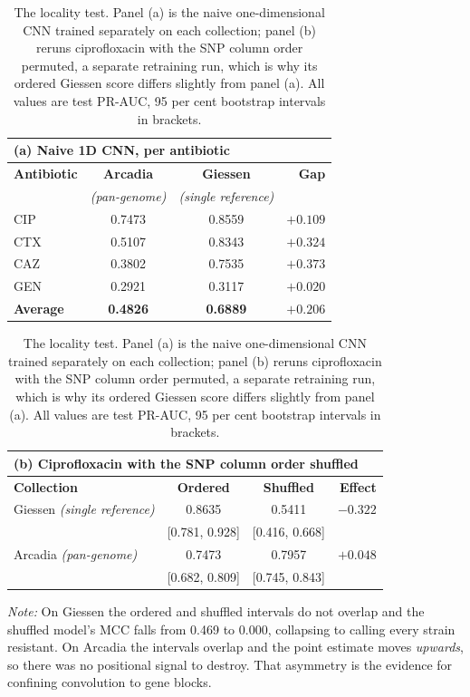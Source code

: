 \begin{table}[htb]
\centering
\caption{The locality test. Panel (a) is the naive one-dimensional CNN trained
separately on each collection; panel (b) reruns ciprofloxacin with the SNP column
order permuted, a separate retraining run, which is why its ordered Giessen score
differs slightly from panel (a). All values are test PR-AUC, 95 per cent bootstrap
intervals in brackets.}
\label{tab:locality}
\small
\begin{tabular}{|l|c|c|r|}
\hline
\multicolumn{4}{|l|}{\textbf{(a) Naive 1D CNN, per antibiotic}} \\ \hline
\textbf{Antibiotic} & \textbf{Arcadia} & \textbf{Giessen} & \textbf{Gap} \\
                    & \textit{(pan-genome)} & \textit{(single reference)} & \\ \hline
CIP & 0.7473 & 0.8559 & $+0.109$ \\ \hline
CTX & 0.5107 & 0.8343 & $+0.324$ \\ \hline
CAZ & 0.3802 & 0.7535 & $+0.373$ \\ \hline
GEN & 0.2921 & 0.3117 & $+0.020$ \\ \hline
\textbf{Average} & \textbf{0.4826} & \textbf{0.6889} & $\mathbf{+0.206}$ \\ \hline
\end{tabular}

\vspace{1em}

\begin{tabular}{|l|c|c|r|}
\hline
\multicolumn{4}{|l|}{\textbf{(b) Ciprofloxacin with the SNP column order shuffled}} \\ \hline
\textbf{Collection} & \textbf{Ordered} & \textbf{Shuffled} & \textbf{Effect} \\ \hline
Giessen \textit{(single reference)} & 0.8635 & 0.5411 & $\mathbf{-0.322}$ \\
                                    & \footnotesize[0.781, 0.928]
                                    & \footnotesize[0.416, 0.668] & \\ \hline
Arcadia \textit{(pan-genome)}       & 0.7473 & 0.7957 & $+0.048$ \\
                                    & \footnotesize[0.682, 0.809]
                                    & \footnotesize[0.745, 0.843] & \\ \hline
\end{tabular}
\vspace{0.4em}

\noindent\footnotesize\textit{Note:} On Giessen the ordered and shuffled intervals do
not overlap and the shuffled model's MCC falls from 0.469 to 0.000, collapsing to
calling every strain resistant. On Arcadia the intervals overlap and the point estimate
moves \emph{upwards}, so there was no positional signal to destroy. That asymmetry is
the evidence for confining convolution to gene blocks.
\end{table}

